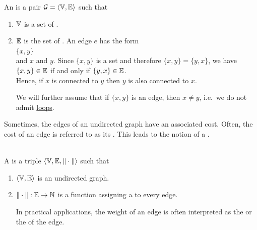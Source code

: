 \begin{Definition}
  An  is a pair
   $\mathcal{G} = \langle {\mathbb V}, {\mathbb E}\rangle$ such that
  \begin{enumerate}
  \item ${\mathbb V}$ is a set of  .
  \item ${\mathbb E}$ is the set of  .  An edge $e$ has the form
        \\[0.2cm]
        \hspace*{1.3cm}
        $\{x, y\}$
        \\[0.2cm]
        and  $x$ and $y$.  Since $\{x,y\}$ is a set and therefore $\{x,y\} = \{y,x\}$, we have
        \\[0.2cm]
        \hspace*{1.3cm}
        $\{x,y\} \in {\mathbb E}$ \quad if and only if \quad $\{y,x\} \in {\mathbb E}$.
        \\[0.2cm]
        Hence, if $x$ is connected to $y$ then $y$ is also connected to $x$.

        We will further assume that if $\{x,y\}$ is an edge, then $x \not= y$, i.e.~we do not admit
        \href{https://en.wikipedia.org/wiki/Loop_(graph_theory)}{loops}.  \eox
  \end{enumerate}
\end{Definition}

\noindent
Sometimes, the edges of an undirected graph have an associated cost.  Often, the cost of an edge is referred to as
its .  This leads to the notion of a .

\begin{Definition} \hspace*{\fill} \\
  A  is a triple 
   $\langle {\mathbb V}, {\mathbb E}, \|\cdot\| \rangle$ such that
  \begin{enumerate}
  \item $\langle {\mathbb V}, {\mathbb E} \rangle$ is an undirected graph.
  \item $\|\cdot\|: {\mathbb E} \rightarrow {\mathbb N}$ is a function assigning a  to every edge.

        In practical applications, the weight of an edge is often interpreted as the  or the
         of the edge.
        \eoxs
  \end{enumerate}
\end{Definition}

